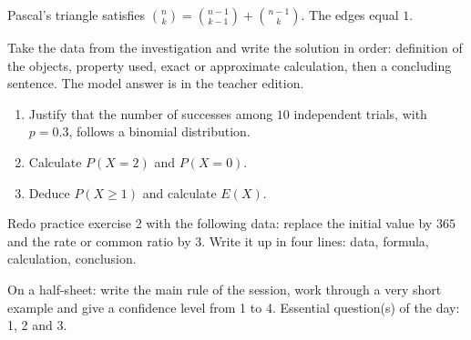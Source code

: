 \begin{traceecrite}Pascal's triangle satisfies $\binom nk=\binom{n-1}{k-1}+\binom{n-1}{k}$. The edges equal $1$.\end{traceecrite}

\begin{exemple}
Take the data from the investigation and write the solution in order: definition of the objects, property used, exact or approximate calculation, then a concluding sentence. The model answer is in the teacher edition.
\end{exemple}

\begin{exercice}[-- essential]
\begin{enumerate}\item Justify that the number of successes among $10$ independent trials, with $p=0.3$, follows a binomial distribution.\item Calculate $P(X=2)$ and $P(X=0)$.\item Deduce $P(X\geq1)$ and calculate $E(X)$.\end{enumerate}
\end{exercice}


\begin{dm}Redo practice exercise 2 with the following data: replace the initial value by $365$ and the rate or common ratio by $3$. Write it up in four lines: data, formula, calculation, conclusion.\end{dm}

\begin{sortie}On a half-sheet: write the main rule of the session, work through a very short example and give a confidence level from 1 to 4. Essential question(s) of the day: 1, 2 and 3.\end{sortie}

